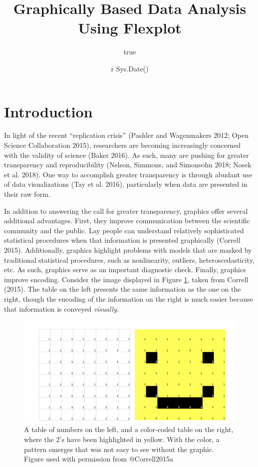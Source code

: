 \documentclass[,]{book}
\title{Graphically Based Data Analysis Using Flexplot}
\author{true}
\date{r Sys.Date()}
\begin{document}
\maketitle

{
\setcounter{tocdepth}{1}
\tableofcontents
}
\chapter*{Introduction}\label{introduction}

In light of the recent ``replication crisis'' (Pashler and Wagenmakers
2012; Open Science Collaboration 2015), researchers are becoming
increasingly concerned with the validity of science (Baker 2016). As
such, many are pushing for greater transparency and reproducibility
(Nelson, Simmons, and Simonsohn 2018; Nosek et al. 2018). One way to
accomplish greater transparency is through abudant use of data
visualizations (Tay et al. 2016), particularly when data are presented
in their raw form.

In addition to answering the call for greater transparency, graphics
offer several additional advantages. First, they improve communication
between the scientific community and the public. Lay people can
understand relatively sophisticated statistical procedures when that
information is presented graphically (Correll 2015). Additionally,
graphics highlight problems with models that are masked by traditional
statistical procedures, such as nonlinearity, outliers,
heteroscedasticity, etc. As such, graphics serve as an important
diagnostic check. Finally, graphics improve encoding. Consider the image
displayed in Figure \ref{fig:smiley}, taken from Correll (2015). The
table on the left presents the same information as the one on the right,
though the encoding of the information on the right is much easier
because that information is conveyed \emph{visually.}

\begin{figure}

{\centering \includegraphics[width=26in]{images/smiley} 

}

\caption{A table of numbers on the left, and a color-coded table on the right, where the 2's have been highlighted in yellow. With the color, a pattern emerges that was not easy to see without the graphic. Figure used with permission from @Correll2015a}\label{fig:smiley}
\end{figure}
\end{document}

